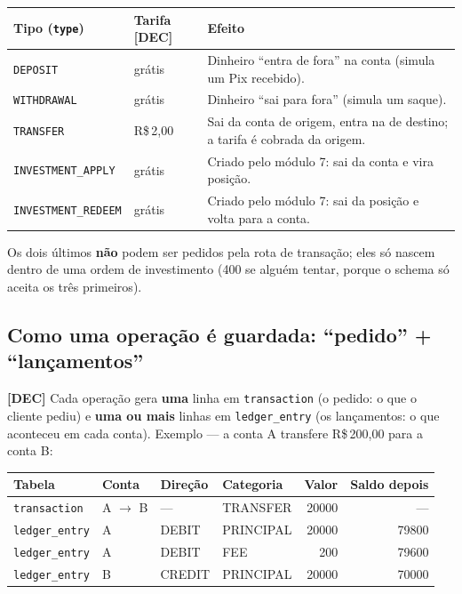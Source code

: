 \documentclass[11pt,a4paper]{article}
\newcommand{\dec}{\textbf{[DEC]}}          %
\newcommand{\rs}{R\$\,}
\newcommand{\tb}[1]{\texttt{#1}}           %
\begin{document}
\begin{tabularx}{\linewidth}{@{}P{3.6cm}P{2.6cm}X@{}}
\toprule
\textbf{Tipo (\tb{type})} & \textbf{Tarifa} \dec & \textbf{Efeito} \\
\midrule
\tb{DEPOSIT} & grátis & Dinheiro ``entra de fora'' na conta (simula um Pix recebido). \\
\tb{WITHDRAWAL} & grátis & Dinheiro ``sai para fora'' (simula um saque). \\
\tb{TRANSFER} & \rs 2,00 & Sai da conta de origem, entra na de destino; a tarifa é cobrada da origem. \\
\tb{INVESTMENT_APPLY} & grátis & Criado pelo módulo 7: sai da conta e vira posição. \\
\tb{INVESTMENT_REDEEM} & grátis & Criado pelo módulo 7: sai da posição e volta para a conta. \\
\bottomrule
\end{tabularx}

Os dois últimos \textbf{não} podem ser pedidos pela rota de transação; eles só nascem dentro de
uma ordem de investimento (400 se alguém tentar, porque o schema só aceita os três primeiros).

\subsection{Como uma operação é guardada: ``pedido'' + ``lançamentos''}

\dec{} Cada operação gera \textbf{uma} linha em \tb{transaction} (o pedido: o que o cliente pediu)
e \textbf{uma ou mais} linhas em \tb{ledger_entry} (os lançamentos: o que aconteceu em cada conta).
Exemplo --- a conta A transfere \rs 200,00 para a conta B:

\begin{center}
\begin{tabular}{@{}llllrr@{}}
\toprule
\textbf{Tabela} & \textbf{Conta} & \textbf{Direção} & \textbf{Categoria} & \textbf{Valor} & \textbf{Saldo depois} \\
\midrule
\tb{transaction} & A $\to$ B & --- & TRANSFER & 20000 & --- \\
\tb{ledger_entry} & A & DEBIT & PRINCIPAL & 20000 & 79800 \\
\tb{ledger_entry} & A & DEBIT & FEE & 200 & 79600 \\
\tb{ledger_entry} & B & CREDIT & PRINCIPAL & 20000 & 70000 \\
\bottomrule
\end{tabular}
\end{center}
\end{document}
